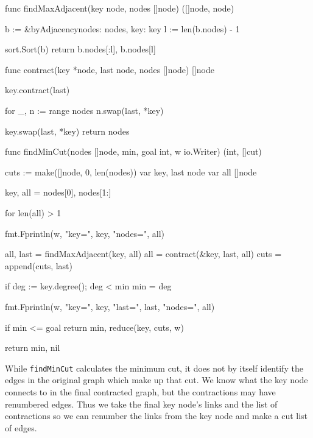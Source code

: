 \documentclass[12pt,notitlepage]{article}
\begin{document}
\begin{golang}
func findMaxAdjacent(key node, nodes []node) ([]node, node) {
	b := &byAdjacency{nodes: nodes, key: key}
	l := len(b.nodes) - 1

	sort.Sort(b)
	return b.nodes[:l], b.nodes[l]
}

func contract(key *node, last node, nodes []node) []node {
	key.contract(last)

	for _, n := range nodes {
		n.swap(last, *key)
	}

	key.swap(last, *key)
	return nodes
}

func findMinCut(nodes []node, min, goal int, w io.Writer) (int, []cut) {
	cuts := make([]node, 0, len(nodes))
	var key, last node
	var all []node

	key, all = nodes[0], nodes[1:]

	for len(all) > 1 {
		fmt.Fprintln(w, "key=", key, "nodes=", all)

		all, last = findMaxAdjacent(key, all)
		all = contract(&key, last, all)
		cuts = append(cuts, last)

		if deg := key.degree(); deg < min {
			min = deg
		}

		fmt.Fprintln(w, "key=", key, "last=", last, "nodes=", all)

		if min <= goal {
			return min, reduce(key, cuts, w)
		}
	}

	return min, nil
}
\end{golang}

While \verb|findMinCut| calculates the minimum cut, it does not by itself identify the
edges in the original graph which make up that cut. We know what the key node connects
to in the final contracted graph, but the contractions may have renumbered edges. Thus
we take the final key node's links and the list of contractions so we can renumber the
links from the key node and make a cut list of edges.
\end{document}
